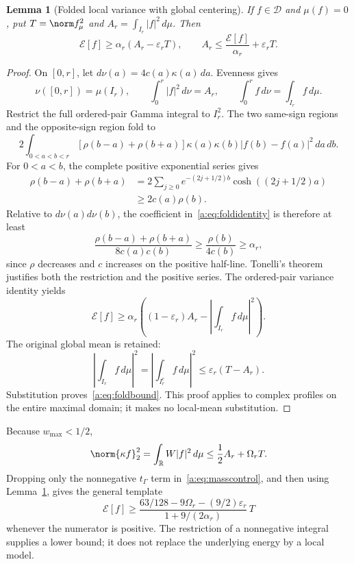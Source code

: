 \documentclass[11pt,a4paper]{article}
\numberwithin{equation}{section}
\newtheorem{lemma}[theorem]{Lemma}
\theoremstyle{definition}\newtheorem{definition}[theorem]{Definition}
\theoremstyle{remark}\newtheorem{remark}[theorem]{Remark}
\newcommand{\R}{\mathbb R}\newcommand{\C}{\mathbb C}\newcommand{\N}{\mathbb N}
\newcommand{\E}{\mathcal E}\newcommand{\D}{\mathcal D}
\newcommand{\tg}{t_\Gamma}\newcommand{\cg}{c_\Gamma}
\begin{document}
\begin{lemma}[Folded local variance with global centering]\label{a:lem:fold}
If $f\in\D$ and $\mu(f)=0$, put $T=\norm f_\mu^2$ and
$A_r=\int_{I_r}|f|^2\,d\mu$. Then
\begin{equation}\label{a:eq:foldbound}
 \E[f]\ge\alpha_r(A_r-\varepsilon_rT),\qquad
 A_r\le\frac{\E[f]}{\alpha_r}+\varepsilon_rT.
\end{equation}
\end{lemma}
\begin{proof}
On $[0,r]$, let $d\nu(a)=4c(a)\kappa(a)\,da$. Evenness gives
\[
 \nu([0,r])=\mu(I_r),\qquad
 \int_0^r|f|^2\,d\nu=A_r,\qquad
 \int_0^rf\,d\nu=\int_{I_r}f\,d\mu.
\]
Restrict the full ordered-pair Gamma integral to $I_r^2$. The two same-sign regions and the opposite-sign region fold to
\begin{equation}\label{a:eq:foldidentity}
 2\int_{0<a<b<r}[\rho(b-a)+\rho(b+a)]
       \kappa(a)\kappa(b)|f(b)-f(a)|^2\,da\,db.
\end{equation}
For $0<a<b$, the complete positive exponential series gives
\begin{align*}
 \rho(b-a)+\rho(b+a)
 &=2\sum_{j\ge0}e^{-(2j+1/2)b}\cosh((2j+1/2)a)\\
 &\ge2c(a)\rho(b).
\end{align*}
Relative to $d\nu(a)d\nu(b)$, the coefficient in~\eqref{a:eq:foldidentity} is therefore at least
\[
 \frac{\rho(b-a)+\rho(b+a)}{8c(a)c(b)}
 \ge\frac{\rho(b)}{4c(b)}\ge\alpha_r,
\]
since $\rho$ decreases and $c$ increases on the positive half-line. Tonelli's theorem justifies both the restriction and the positive series. The ordered-pair variance identity yields
\[
 \E[f]\ge\alpha_r\left((1-\varepsilon_r)A_r
                  -\left|\int_{I_r}f\,d\mu\right|^2\right).
\]
The original global mean is retained:
\[
 \left|\int_{I_r}f\,d\mu\right|^2
 =\left|\int_{I_r^c}f\,d\mu\right|^2
 \le\varepsilon_r(T-A_r).
\]
Substitution proves~\eqref{a:eq:foldbound}. This proof applies to complex profiles on the entire maximal domain; it makes no local-mean substitution.
\end{proof}

Because $w_{\max}<1/2$,
\begin{equation}\label{a:eq:masswindow}
 \norm{\kappa f}_2^2=\int_\R W|f|^2\,d\mu
 \le\frac12A_r+\Omega_rT.
\end{equation}
Dropping only the nonnegative $\tg$ term in~\eqref{a:eq:masscontrol}, and then using Lemma~\ref{a:lem:fold}, gives the general template
\begin{equation}\label{a:eq:seedtemplate}
 \E[f]\ge
 \frac{63/128-9\Omega_r-(9/2)\varepsilon_r}
      {1+9/(2\alpha_r)}\,T
\end{equation}
whenever the numerator is positive. The restriction of a nonnegative integral supplies a lower bound; it does not replace the underlying energy by a local model.
\end{document}

